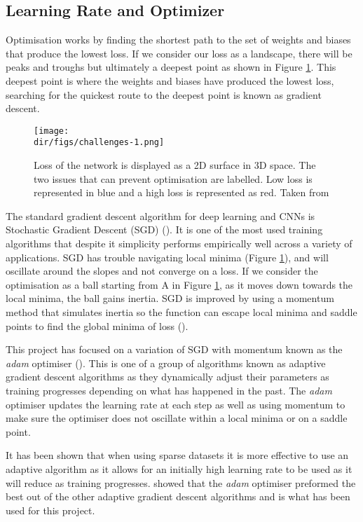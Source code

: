 \subsection{Learning Rate and Optimizer}
Optimisation works by finding the shortest path to the set of weights and biases that produce the lowest loss. If we consider our loss as a landscape, there will be peaks and troughs but ultimately a deepest point as shown in Figure \ref{fig.loss_landscape}. This deepest point is where the weights and biases have produced the lowest loss, searching for the quickest route to the deepest point is known as gradient descent.
\begin{figure}[htbp]
    \centering
    \texttt{[image: \\dir/figs/challenges-1.png]}
    \caption[3D Schematic of CNN Loss]{Loss of the network is displayed as a 2D surface in 3D space. The  two issues that can prevent optimisation are labelled. Low loss is represented in blue and a high loss is represented as red. Taken from \citet{kathuria18}}
    \label{fig.loss_landscape}
\end{figure}
\par
The standard gradient descent algorithm for deep learning and CNNs is Stochastic Gradient Descent (SGD) (\cite{robbins51}). It is one of the most used training algorithms that despite it simplicity performs empirically well across a variety of applications. SGD has trouble navigating local minima (Figure \ref{fig.loss_landscape}), and will oscillate around the slopes and not converge on a loss. If we consider the optimisation as a ball starting from A in Figure \ref{fig.loss_landscape}, as it moves down towards the local minima, the ball gains inertia. SGD is improved by using a momentum method that simulates inertia so the function can escape local minima and saddle points to find the global minima of loss (\cite{ruder16}). 
\par
This project has focused on a variation of SGD with momentum known as the \textit{adam} optimiser (\cite{kingma14}). This is one of a group of algorithms known as adaptive gradient descent algorithms as they dynamically adjust their parameters as training progresses depending on what has happened in the past. The \textit{adam} optimiser updates the learning rate at each step as well as using momentum to make sure the optimiser does not oscillate within a local minima or on a saddle point. 
\par
It has been shown that when using sparse datasets it is more effective to use an adaptive algorithm as it allows for an initially high learning rate to be used as it will reduce as training progresses. \citet{kingma14} showed that the \textit{adam} optimiser preformed the best out of the other adaptive gradient descent algorithms and is what has been used for this project. 
